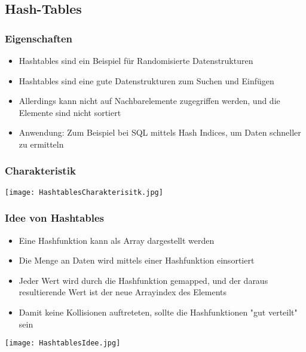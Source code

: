 	\newpage
	\subsection{Hash-Tables}
		\begin{minipage}[t]{0.65\textwidth}
			\subsubsection{Eigenschaften}
				\begin{itemize}
					\item Hashtables sind ein Beispiel für Randomisierte Datenstrukturen
					\item Hashtables sind eine gute Datenstrukturen zum Suchen und Einfügen
					\item Allerdings kann nicht auf Nachbarelemente zugegriffen werden, und die Elemente
						sind nicht sortiert
					\item Anwendung: Zum Beispiel bei SQL mittels Hash Indices, um Daten schneller zu ermitteln
				\end{itemize}
		\end{minipage}
		\hspace{0.5cm}
		\begin{minipage}[t]{0.3\textwidth}
			\begin{center}
				\subsubsection{Charakteristik}
					\texttt{[image: HashtablesCharakterisitk.jpg]}
			\end{center}
		\end{minipage}


		\subsubsection{Idee von Hashtables}
			\begin{minipage}{0.6\textwidth}
				\begin{itemize}
					\item Eine Hashfunktion kann als Array dargestellt werden
					\item Die Menge an Daten wird mittels einer Hashfunktion einsortiert
					\item Jeder Wert wird durch die Hashfunktion gemapped, und der daraus resultierende
						Wert ist der neue Arrayindex des Elements
					\item Damit keine Kollisionen auftreteten, sollte die Hashfunktionen "gut verteilt" sein
				\end{itemize}
			\end{minipage}
			\hspace{0.5cm}
			\begin{minipage}{0.35\textwidth}
				\begin{center}
					\texttt{[image: HashtablesIdee.jpg]}
				\end{center}
			\end{minipage}


